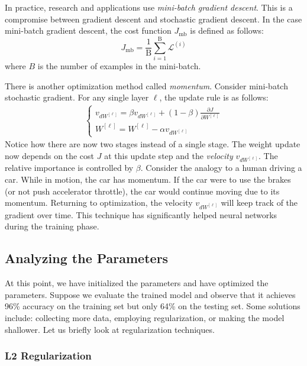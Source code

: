 \documentclass{article}
\numberwithin{equation}{section}
\begin{document}
In practice, research and applications use \textit{mini-batch gradient descent}. This is a compromise between gradient descent and stochastic gradient descent. In the case mini-batch gradient descent, the cost function $J_{\textrm{mb}}$ is defined as follows:
\begin{equation}
J_{\textrm{mb}} = \frac{1}{\textrm{B}} \sum\limits_{i=1}^{\textrm{B}} \mathcal{L}^{(i)}
\end{equation}
where $B$ is the number of examples in the mini-batch.

There is another optimization method called \textit{momentum}. Consider mini-batch stochastic gradient. For any single layer $\ell$, the update rule is as follows:
\begin{align}
\begin{cases}
v_{dW^{[\ell]}} = \beta v_{dW^{[\ell]}} + (1- \beta) \frac{\partial J}{\partial W^{[\ell]}} \\
W^{[\ell]} =  W^{[\ell]} - \alpha v_{dW^{[\ell]}}
\end{cases}
\end{align}
Notice how there are now two stages instead of a single stage. The weight update now depends on the cost $J$ at this update step and the \textit{velocity} $v_{dW^{[\ell]}}$. The relative importance is controlled by $\beta$.
Consider the analogy to a human driving a car. While in motion, the car has momentum.
If the car were to use the brakes (or not push accelerator throttle), the car would continue moving due to its momentum.
Returning to optimization, the velocity $v_{dW^{[\ell]}}$ will keep track of the gradient over time.
This technique has significantly helped neural networks during the training phase.

\subsection{Analyzing the Parameters}

At this point, we have initialized the parameters and have optimized the parameters.
Suppose we evaluate the trained model and observe that it achieves 96\% accuracy on the training set but only 64\% on the testing set.
Some solutions include: collecting more data, employing regularization, or making the model shallower.
Let us briefly look at regularization techniques.

\subsubsection{L2 Regularization}
\end{document}
